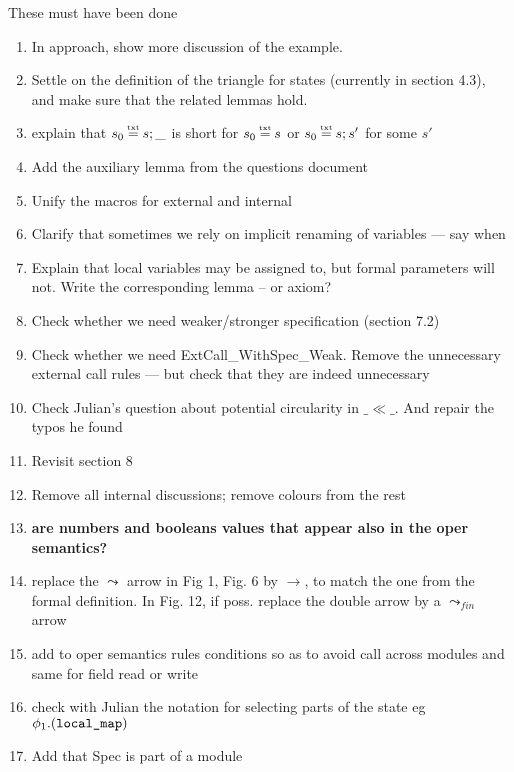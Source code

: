 \documentclass[acmsmall,review,anonymous]{acmart}\settopmatter{printfolios=true}
\begin{document}
 These must have been done
\begin{enumerate}
\item
In approach, show more discussion of the  example.
\item
Settle on the definition of  the triangle for states (currently in section 4.3), and make sure that the related lemmas hold.
\item
explain that $s_0\txteq s;\_$ is short for $s_0\txteq s$  or  $s_0\txteq s;s'$ for some $s'$
\item
Add the auxiliary lemma from the questions document
\item
Unify the macros for external and internal

\item
Clarify that sometimes we rely on implicit renaming of variables — say when

\item
Explain that local variables may be assigned to, but formal parameters will not. Write the corresponding lemma -- or axiom?

\item
Check whether we need weaker/stronger specification (section 7.2)

\item
Check whether we need ExtCall\_WithSpec\_Weak. Remove the unnecessary external call rules — but check that they are indeed unnecessary

\item
Check Julian's question about potential circularity in $\_\ll\_$. And repair the typos he found
\item
Revisit section 8

\item
Remove all internal discussions; remove colours from the rest

\item

\textbf{are numbers and booleans values that appear also in the oper semantics?}
\item

replace the $\leadsto$ arrow in Fig 1, Fig. 6 by $\rightarrow$, to match the one from the formal definition. In Fig. 12, if poss. replace the double arrow by a $\leadsto_{fin}$ arrow 

\item
add to oper semantics rules conditions so as to avoid call across modules and same for field read or write

\item
check with Julian the notation for selecting parts of the state eg $\phi_1.(\mbox{\normalfont{\texttt{local\_map}}})$

\item
Add that Spec is part of a module
\end{enumerate}
\end{document}
